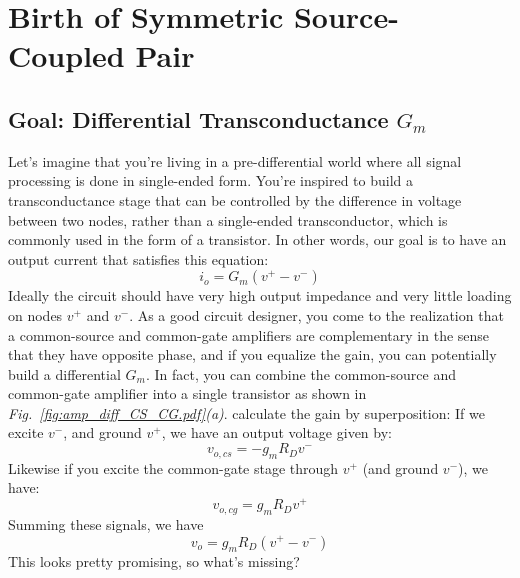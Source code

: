 \section{Birth of Symmetric Source-Coupled Pair}
\subsection{Goal:  Differential Transconductance \texorpdfstring{$G_m$}{}}
Let's imagine that you're living in a pre-differential world where all signal processing is done in single-ended form.  You're inspired to build a transconductance stage that can be controlled by the difference in voltage between two nodes, rather than a single-ended transconductor, which is commonly used in the form of a transistor.   In other words, our goal is to have an output current that satisfies this equation:
    \begin{equation}
        i_o = G_m (v^+ - v^-)
    \end{equation}
Ideally the circuit should have very high output impedance and very little loading on nodes $v^+$ and $v^-$.  As a good circuit designer, you come to the realization that a common-source and common-gate amplifiers are complementary in the sense that they have opposite phase, and if you equalize the gain, you can potentially build a differential $G_m$.  In fact, you can combine the common-source and common-gate amplifier into a single transistor as shown in \emph{Fig.~\ref{fig:amp_diff_CS_CG.pdf}(a)}.  
calculate the gain by superposition:  If we excite $v^-$, and ground $v^+$, we have an output voltage given by:
    \begin{equation}
        v_{o,cs} = -g_m R_D v^-
    \end{equation} 
Likewise if you excite the common-gate stage through $v^+$ (and ground $v^-$), we have:
    \begin{equation}
        v_{o,cg} = g_m R_D  v^+
    \end{equation} 
Summing these signals, we have
    \begin{equation}
        v_o =   g_m R_D  (v^+ - v^- )
    \end{equation}
This looks pretty promising, so what's missing? 
